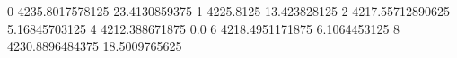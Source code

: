 0 4235.8017578125 23.4130859375
1 4225.8125 13.423828125
2 4217.55712890625 5.16845703125
4 4212.388671875 0.0
6 4218.4951171875 6.1064453125
8 4230.8896484375 18.5009765625
